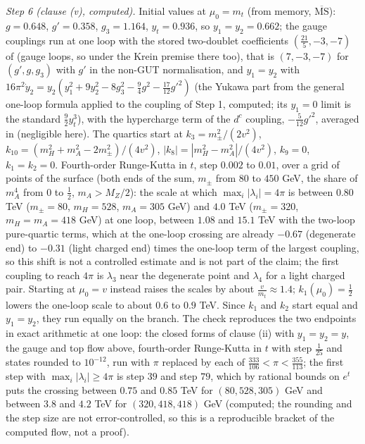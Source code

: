 \emph{Step 6 (clause (v), computed).} Initial values at $\mu_{0} = m_{t}$ (from memory, $\overline{\mathrm{MS}}$): $g = 0.648$, $g' = 0.358$, $g_{3} = 1.164$, $y_{t} = 0.936$, so $y_{1} = y_{2} = 0.662$; the gauge couplings run at one loop with the stored two-doublet coefficients $(\tfrac{21}{5}, -3, -7)$ of  (gauge loops, so under the Krein premise there too), that is $(7, -3, -7)$ for $(g', g, g_{3})$ with $g'$ in the non-GUT normalisation, and $y_{1} = y_{2}$ with $16\pi^{2}\dot y_{2} = y_{2}(y_{1}^{2} + 9y_{2}^{2} - 8g_{3}^{2} - \tfrac94g^{2} - \tfrac{17}{12}g'^{2})$ (the Yukawa part from the general one-loop formula applied to the coupling of Step 1, computed; its $y_{1} = 0$ limit is the standard $\tfrac92y_{t}^{3}$), with the hypercharge term of the $d^{c}$ coupling, $-\tfrac{5}{12}g'^{2}$, averaged in (negligible here). The quartics start at $k_{3} = m_{\pm}^{2}/(2v^{2})$, $k_{10} = (m_{H}^{2} + m_{A}^{2} - 2m_{\pm}^{2})/(4v^{2})$, $|k_{8}| = |m_{H}^{2} - m_{A}^{2}|/(4v^{2})$, $k_{9} = 0$, $k_{1} = k_{2} = 0$. Fourth-order Runge-Kutta in $t$, step $0.002$ to $0.01$, over a grid of points of the surface (both ends of the sum, $m_{\pm}$ from $80$ to $450$ GeV, the share of $m_{A}^{4}$ from $0$ to $\tfrac12$, $m_{A} > M_{Z}/2$): the scale at which $\max_{i}|\lambda_{i}| = 4\pi$ is between $0.80$ TeV ($m_{\pm} = 80$, $m_{H} = 528$, $m_{A} = 305$ GeV) and $4.0$ TeV ($m_{\pm} = 320$, $m_{H} = m_{A} = 418$ GeV) at one loop, between $1.08$ and $15.1$ TeV with the two-loop pure-quartic terms, which at the one-loop crossing are already $-0.67$ (degenerate end) to $-0.31$ (light charged end) times the one-loop term of the largest coupling, so this shift is not a controlled estimate and is not part of the claim; the first coupling to reach $4\pi$ is $\lambda_{3}$ near the degenerate point and $\lambda_{4}$ for a light charged pair. Starting at $\mu_{0} = v$ instead raises the scales by about $\tfrac{v}{m_{t}} \approx 1.4$; $k_{1}(\mu_{0}) = \tfrac12$ lowers the one-loop scale to about $0.6$ to $0.9$ TeV. Since $k_{1}$ and $k_{2}$ start equal and $y_{1} = y_{2}$, they run equally on the branch. The check reproduces the two endpoints in exact arithmetic at one loop: the closed forms of clause (ii) with $y_{1} = y_{2} = y$, the gauge and top flow above, fourth-order Runge-Kutta in $t$ with step $\tfrac{1}{25}$ and states rounded to $10^{-12}$, run with $\pi$ replaced by each of $\tfrac{333}{106} < \pi < \tfrac{355}{113}$; the first step with $\max_{i}|\lambda_{i}| \ge 4\pi$ is step $39$ and step $79$, which by rational bounds on $e^{t}$ puts the crossing between $0.75$ and $0.85$ TeV for $(80, 528, 305)$ GeV and between $3.8$ and $4.2$ TeV for $(320, 418, 418)$ GeV (computed; the rounding and the step size are not error-controlled, so this is a reproducible bracket of the computed flow, not a proof).

